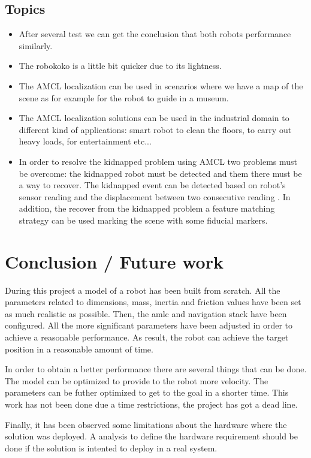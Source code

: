 \documentclass[10pt,journal,compsoc]{IEEEtran}
\begin{document}
\subsection{Topics}

\begin{itemize}
\item After several test we can get the conclusion that both robots performance similarly.
\item The robokoko is a little bit quicker due to its lightness.
\item The AMCL localization can be used in scenarios where we have a map of the scene as for example for the robot to guide in a museum.
\item The AMCL localization solutions can be used in the industrial domain to different kind of applications: smart robot to clean the floors, to carry out heavy loads, for entertainment etc...
\item  In order to resolve the kidnapped problem using AMCL two problems must be overcome: the kidnapped robot must be detected and them there must be a way to recover.  The kidnapped event can be detected based on robot’s sensor reading and the displacement  between two consecutive reading \cite{kidnapped}.  In addition, the recover from the kidnapped problem a feature matching strategy can be used marking the scene with some fiducial markers.\cite{kidnappedrecover} 
\end{itemize}

\section{Conclusion / Future work}


During this project a model of a robot has been built from scratch. All the parameters related to dimensions, mass, inertia and friction values have been set as much realistic as possible. Then, the amlc and navigation stack have been configured. All the more significant parameters have been adjusted in order to achieve a reasonable performance. As result, the robot can achieve the target position in a reasonable amount of time. 

In order to obtain a better performance there are several things that can be done. The model can be optimized to provide to the robot more velocity. The parameters can be futher optimized to get to the goal in a shorter time. This work has not been done due a time restrictions, the project has got a dead line.

Finally, it has been observed some limitations about the hardware where the solution was deployed. A analysis to define the hardware requirement should be done if the solution is intented to deploy in a real system.
\end{document}
